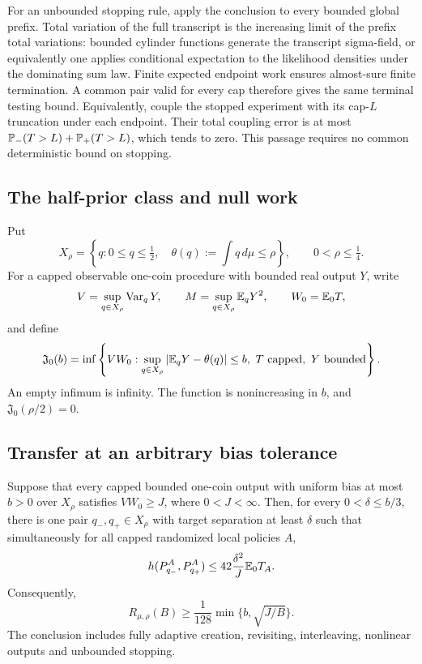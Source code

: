 For an unbounded stopping rule, apply the conclusion to every bounded
global prefix. Total variation of the full transcript is the increasing
limit of the prefix total variations: bounded cylinder functions generate
the transcript sigma-field, or equivalently one applies conditional
expectation to the likelihood densities under the dominating sum law.
Finite expected endpoint work ensures almost-sure finite termination.
A common pair valid for every cap therefore gives the same terminal
testing bound. Equivalently, couple the stopped experiment with its
cap-$L$ truncation under each endpoint. Their total coupling error is at
most $\mathbb P_-(T>L)+\mathbb P_+(T>L)$, which tends to zero. This passage
requires no common deterministic bound on stopping.

\subsection{The half-prior class and null work}

Put
\[
 X_\rho=\left\{q:0\le q\le\tfrac12,\quad
                  \theta(q):=\int q\,d\mu\le\rho\right\},
 \qquad 0<\rho\le\tfrac14.
\]
For a capped observable one-coin procedure with bounded real output \(Y\),
write
\[
 V=\sup_{q\in X_\rho}\operatorname{Var}_qY,\qquad
 M=\sup_{q\in X_\rho}\mathbb E_qY^2,\qquad W_0=\mathbb E_0T,
\]
and define
\begin{equation}
 \mathfrak J_0(b)=\inf\left\{VW_0:
       \sup_{q\in X_\rho}|\mathbb E_qY-\theta(q)|\le b,
       \ T\text{ capped},\ Y\text{ bounded}\right\}.
 \label{eq:null-bias-complexity}
\end{equation}
An empty infimum is infinity.  The function is nonincreasing in \(b\),
and \(\mathfrak J_0(\rho/2)=0\).

\subsection{Transfer at an arbitrary bias tolerance}

\begin{theorem}
\label{thm:bias-transfer}
Suppose that every capped bounded one-coin output with uniform bias at
most \(b>0\) over \(X_\rho\) satisfies \(VW_0\ge J\), where
\(0<J<\infty\).  Then, for every \(0<\delta\le b/3\), there is one pair
\(q_-,q_+\in X_\rho\) with target separation at least \(\delta\) such
that simultaneously for all capped randomized local policies \(A\),
\begin{equation}
 h(P_{q_-}^A,P_{q_+}^A)
 \le42\frac{\delta^2}{J}\mathbb E_0T_A.
 \label{eq:bias-common-pair}
\end{equation}
Consequently,
\begin{equation}
 R_{\mu,\rho}(B)\ge\frac1{128}
                 \min\{b,\sqrt{J/B}\}.
 \label{eq:bias-population-transfer}
\end{equation}
The conclusion includes fully adaptive creation, revisiting, interleaving,
nonlinear outputs and unbounded stopping.  
\end{theorem}

